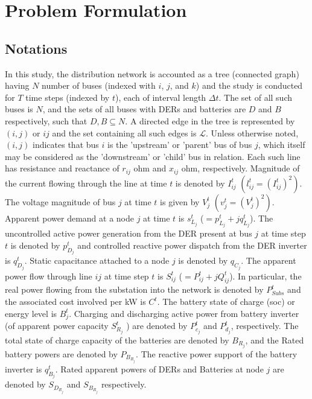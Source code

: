 \documentclass[../../outputs/main.tex]{subfiles}
\begin{document}
\section{Problem Formulation}

\subsection{Notations}
In this study, the distribution network is accounted as a tree (connected graph) having $N$ number of buses (indexed with \(i\), \(j\), and \(k\)) and the study is conducted for $T$ time steps (indexed by $t$), each of interval length $\Delta t$. The set of all such buses is $N$, and the sets of all buses with DERs and batteries are $D$ and $B$ respectively, such that $D, B \subseteq N$.
A directed edge in the tree is represented by $(i, j)$ or $ij$ and the set containing all such edges is $\mathcal{L}$. Unless otherwise noted, $(i, j)$ indicates that bus $i$ is the 'upstream' or 'parent' bus of bus $j$, which itself may be considered as the 'downstream' or 'child' bus in relation. Each such line has resistance and reactance of \(r_{ij}\) ohm and \(x_{ij}\) ohm, respectively. Magnitude of the current flowing through the line at time \(t\) is denoted by \(I_{ij}^t\) $\left(l_{ij}^t=\left(I_{ij}^t\right)^2\right)$. The voltage magnitude of bus \(j\) at time \(t\) is given by \(V_j^t\) $\left(v_j^t=\left(V_j^t\right)^2\right)$. Apparent power demand at a node \(j\) at time \(t\) is \(s^t_{L_j}\) (\(=p^t_{L_j}+\textit{j}q^t_{L_j}\)). The uncontrolled active power generation from the DER present at bus \(j\) at time step \(t\) is denoted by \(p^t_{D_j}\) and controlled reactive power dispatch from the DER inverter is \(q^t_{D_j}\). Static capacitance attached to a node $j$ is denoted by $q_{C_j}$. The apparent power flow through line {\(ij\)} at time step \(t\) is \(S_{ij}^t\) (\(=P_{ij}^t+\textit{j}Q_{ij}^t\)). In particular, the real power flowing from the substation into the network is denoted by $P^t_{Subs}$ and the associated cost involved per kW is $C^t$. The battery state of charge (soc) or energy level is \(B_j^t\). Charging and discharging active power from battery inverter (of apparent power capacity \(S^{t}_{R_j}\) ) are denoted by \(P_{c_j}^t\) and \(P_{d_j}^t\), respectively. The total state of charge capacity of the batteries are denoted by $B_{R_j}$, and the Rated battery powers are denoted by $P_{B_{R_j}}$. The reactive power support of the battery inverter is \(q_{B_j}^t\). Rated apparent powers of DERs and Batteries at node $j$ are denoted by $S_{D_{R_j}}$ and $S_{B_{R_j}}$ respectively.
\end{document}
